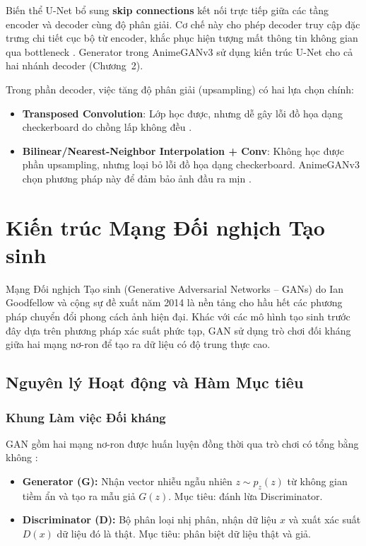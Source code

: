 Biến thể U-Net bổ sung \textbf{skip connections} kết nối trực tiếp giữa các tầng encoder và decoder cùng độ phân giải. Cơ chế này cho phép decoder truy cập đặc trưng chi tiết cục bộ từ encoder, khắc phục hiện tượng mất thông tin không gian qua bottleneck \cite{Hasan2019}. Generator trong AnimeGANv3 sử dụng kiến trúc U-Net cho cả hai nhánh decoder (Chương~2).

Trong phần decoder, việc tăng độ phân giải (upsampling) có hai lựa chọn chính:
\begin{itemize}
    \item \textbf{Transposed Convolution}: Lớp học được, nhưng dễ gây lỗi đồ họa dạng checkerboard do chồng lấp không đều \cite{Hasan2019}.
    \item \textbf{Bilinear/Nearest-Neighbor Interpolation + Conv}: Không học được phần upsampling, nhưng loại bỏ lỗi đồ họa dạng checkerboard. AnimeGANv3 chọn phương pháp này để đảm bảo ảnh đầu ra mịn \cite{Liu2024}.
\end{itemize}

\section{Kiến trúc Mạng Đối nghịch Tạo sinh}
\label{sec:gan}

Mạng Đối nghịch Tạo sinh (Generative Adversarial Networks -- GANs) do Ian Goodfellow và cộng sự đề xuất năm 2014 \cite{Goodfellow2014} là nền tảng cho hầu hết các phương pháp chuyển đổi phong cách ảnh hiện đại. Khác với các mô hình tạo sinh trước đây dựa trên phương pháp xác suất phức tạp, GAN sử dụng trò chơi đối kháng giữa hai mạng nơ-ron để tạo ra dữ liệu có độ trung thực cao.

\subsection{Nguyên lý Hoạt động và Hàm Mục tiêu}
\subsubsection{Khung Làm việc Đối kháng}

GAN gồm hai mạng nơ-ron được huấn luyện đồng thời qua trò chơi có tổng bằng không \cite{Goodfellow2014}:
\begin{itemize}
    \item \textbf{Generator (G):} Nhận vector nhiễu ngẫu nhiên $z \sim p_z(z)$ từ không gian tiềm ẩn và tạo ra mẫu giả $G(z)$. Mục tiêu: đánh lừa Discriminator.
    \item \textbf{Discriminator (D):} Bộ phân loại nhị phân, nhận dữ liệu $x$ và xuất xác suất $D(x)$ dữ liệu đó là thật. Mục tiêu: phân biệt dữ liệu thật và giả.
\end{itemize}

